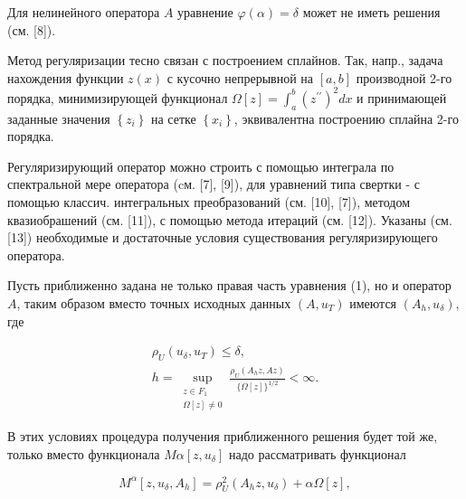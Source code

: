 \documentclass[10pt]{article}
\begin{document}
Для нелинейного оператора $A$ уравнение $\varphi(\alpha)=\delta$ может не иметь решения (см. [8]).



Метод регуляризации тесно связан с построением сплайнов. Так, напр., задача нахождения функции $z(x)$ с кусочно непрерывной на $[a, b]$ производной 2-го порядка, минимизирующей функционал $\Omega[z]=\int_{a}^{b}\left(z^{\prime \prime}\right)^{2} d x$ и принимающей заданные значения $\left\{z_{i}\right\}$ на сетке $\left\{x_{i}\right\}$, эквивалентна построению сплайна 2-го порядка.



Регуляризирующий оператор можно строить с помощью интеграла по спектральной мере оператора (cм. [7], [9]), для уравнений типа свертки - с помощью классич. интегральных преобразований (см. [10], [7]), методом квазиобрашений (см. [11]), с помощью метода итераций (см. [12]). Указаны (см. [13]) необходимые и достаточные условия существования регуляризирующего оператора.



Пусть приближенно задана не только правая часть уравнения (1), но и оператор $A$, таким образом вместо точных исходных данных $\left(A, u_{T}\right)$ имеются $\left(A_{h}, u_{\delta}\right)$, где



\[

\begin{gathered}

\rho_{U}\left(u_{\delta}, u_{T}\right) \leqslant \delta, \\

h=\sup _{\substack{z \in F_{1} \\

\Omega[z] \neq 0}} \frac{\rho_{U}\left(A_{h} z, A z\right)}{\{\Omega[z]\}^{1 / 2}}<\infty .

\end{gathered}

\]



В этих условиях процедура получения приближенного решения будет той же, только вместо функционала $M \alpha\left[z, u_{\delta}\right]$ надо рассматривать функционал



\[

M^{\alpha}\left[z, u_{\delta}, A_{h}\right]=\rho_{U}^{2}\left(A_{h} z, u_{\delta}\right)+\alpha \Omega[z],

\]
\end{document}
